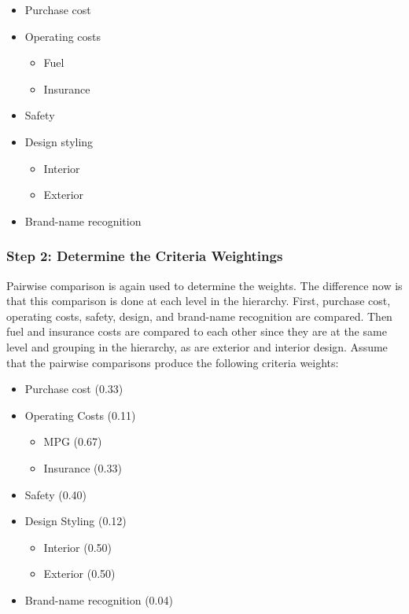 \begin{itemize}
\item
  Purchase cost
\item
  Operating costs

  \begin{itemize}
  \item
    Fuel
  \item
    Insurance
  \end{itemize}
\item
  Safety
\item
  Design styling

  \begin{itemize}
  \item
    Interior
  \item
    Exterior
  \end{itemize}
\item
  Brand-name recognition
\end{itemize}

\subsubsection*{Step 2: Determine the Criteria
Weightings}\label{step-2-determine-the-criteria-weightings-1}

Pairwise comparison is again used to determine the weights. The
difference now is that this comparison is done at each level in the
hierarchy. First, purchase cost, operating costs, safety, design, and
brand-name recognition are compared. Then fuel and insurance costs are
compared to each other since they are at the same level and grouping in
the hierarchy, as are exterior and interior design. Assume that the
pairwise comparisons produce the following criteria weights:

\begin{itemize}
\item
  Purchase cost (0.33)
\item
  Operating Costs (0.11)

  \begin{itemize}
  \item
    MPG (0.67)
  \item
    Insurance (0.33)
  \end{itemize}
\item
  Safety (0.40)
\item
  Design Styling (0.12)

  \begin{itemize}
  \item
    Interior (0.50)
  \item
    Exterior (0.50)
  \end{itemize}
\item
  Brand-name recognition (0.04)
\end{itemize}


